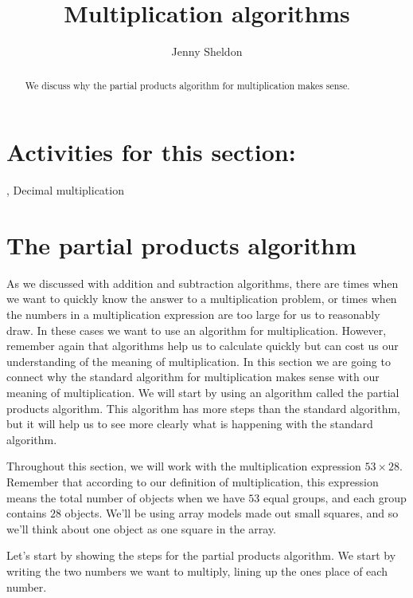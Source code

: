 \documentclass{ximera}
\title{Multiplication algorithms}
\author{Jenny Sheldon}
\begin{document}
\begin{abstract}
We discuss why the partial products algorithm for multiplication makes sense.
\end{abstract}
\maketitle

\section{Activities for this section:} 
, 
Decimal multiplication

\section{The partial products algorithm}

As we discussed with addition and subtraction algorithms, there are times when we want to quickly know the answer to a multiplication problem, or times when the numbers in a multiplication expression are too large for us to reasonably draw. In these cases we want to use an algorithm for multiplication.  However, remember again that algorithms help us to calculate quickly but can cost us our understanding of the meaning of multiplication. In this section we are going to connect why the standard algorithm for multiplication makes sense with our meaning of multiplication. We will start by using an algorithm called the partial products algorithm. This algorithm has more steps than the standard algorithm, but it will help us to see more clearly what is happening with the standard algorithm.

Throughout this section, we will work with the multiplication expression $53 \times 28$. Remember that according to our definition of multiplication, this expression means the total number of objects when we have $53$ equal groups, and each group contains $28$ objects. We'll be using array models made out small squares, and so we'll think about one object as one square in the array.

Let's start by showing the steps for the partial products algorithm. We start by writing the two numbers we want to multiply, lining up the ones place of each number.

\begin{image}
\end{image}
\end{document}
